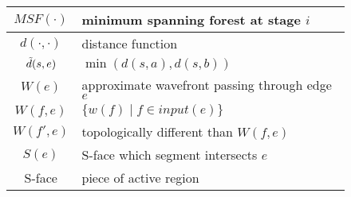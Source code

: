 \begin{figure}
\begin{center}
\begin{tabular}{| c | l |}
	\hline
	$MSF(\cdot)$ & minimum spanning forest at stage $i$ \\
	\hline
	$d(\cdot, \cdot)$ & distance function \\
	\hline
	$\Tilde{d}(s,e)$ & $\min(d(s,a),d(s,b))$ \\
	\hline
	$W(e)$ & approximate wavefront passing through edge $e$ \\
	\hline
	$W(f,e)$ & $\{w(f) \mid f \in input(e)\}$ \\
	\hline
	$W(f',e)$ & topologically different than $W(f,e)$ \\
	\hline
	$S(e)$ & S-face which segment intersects $e$ \\
	\hline
	S-face & piece of active region
	\hline
\end{tabular}
\end{center}
\end{figure}